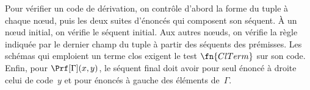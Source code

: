 \documentclass[../../../include/open-logic-section]{subfiles}
\begin{document}
\begin{explain}
Pour vérifier un code de dérivation, on contrôle d'abord la forme du
tuple à chaque nœud, puis les deux suites d'énoncés qui composent
son séquent. À un nœud initial, on vérifie le séquent initial.
Aux autres nœuds, on vérifie la règle indiquée par le dernier
champ du tuple à partir des séquents des prémisses. Les schémas
qui emploient un terme clos exigent le test $\fn{ClTerm}$ sur
son code. Enfin, pour $\Prf[\Gamma](x,y)$, le séquent final doit
avoir pour seul énoncé à droite celui de code~$y$ et pour
énoncés à gauche des éléments de~$\Gamma$.
\end{explain}
\end{document}
